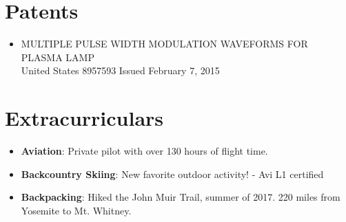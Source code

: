 \documentclass[letterpaper,11pt]{article}
\newcommand{\resumeItem}[2]{
  \item\small{
    \textbf{#1}{: #2 \vspace{-2pt}}
  }
}
\newcommand{\resumeSubItem}[2]{\resumeItem{#1}{#2}\vspace{-4pt}}
\newcommand{\resumeSubHeadingListStart}{\begin{itemize}[leftmargin=*]}
\newcommand{\resumeSubHeadingListEnd}{\end{itemize}}
\begin{document}
\section{Patents}
  \resumeSubHeadingListStart
    \item{
      {MULTIPLE PULSE WIDTH MODULATION WAVEFORMS FOR PLASMA LAMP \\
      United States 8957593 \hfill Issued February 7, 2015}
    }
  \resumeSubHeadingListEnd

\section{Extracurriculars}
  \resumeSubHeadingListStart
    \resumeSubItem{Aviation}
      {Private pilot with over 130 hours of flight time.}
    \resumeSubItem{Backcountry Skiing}{New favorite outdoor activity! - Avi L1 certified}
    \resumeSubItem{Backpacking}
      {Hiked the John Muir Trail, summer of 2017.  220 miles from Yosemite to Mt. Whitney.}
  \resumeSubHeadingListEnd

%
\end{document}

